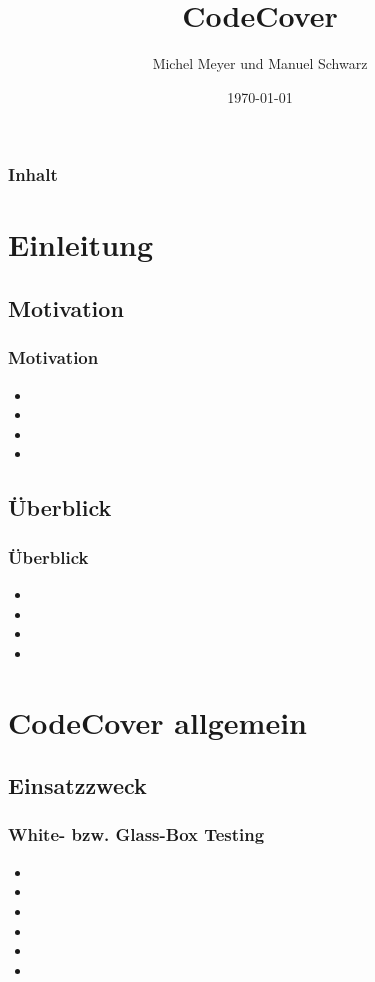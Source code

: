 \documentclass{beamer}
\begin{document}
  \title[CodeCover\hspace{105mm}\insertframenumber/\inserttotalframenumber]{CodeCover}
  \author{Michel Meyer und Manuel Schwarz}
  \date{\today}

  \begin{frame}
    \titlepage
  \end{frame}

  \begin{frame}\frametitle{Inhalt}\tableofcontents
  \end{frame}


  \section{Einleitung}
  \subsection{Motivation}
  \begin{frame}\frametitle{Motivation}
    \begin{itemize}
      \item 
      \item 
      \item 
      \item 
    \end{itemize}
  \end{frame}

  \subsection{Überblick}
  \begin{frame}\frametitle{Überblick}
    \begin{itemize}
      \item 
      \item 
      \item 
      \item 
    \end{itemize}
  \end{frame}

  \section{CodeCover allgemein}
  \subsection{Einsatzzweck}
  \begin{frame}\frametitle{White- bzw. Glass-Box Testing}
    \begin{itemize}
      \item 
      \item 
      \item 
      \item 
      \item 
      \item 
    \end{itemize}
  \end{frame}
\end{document}
